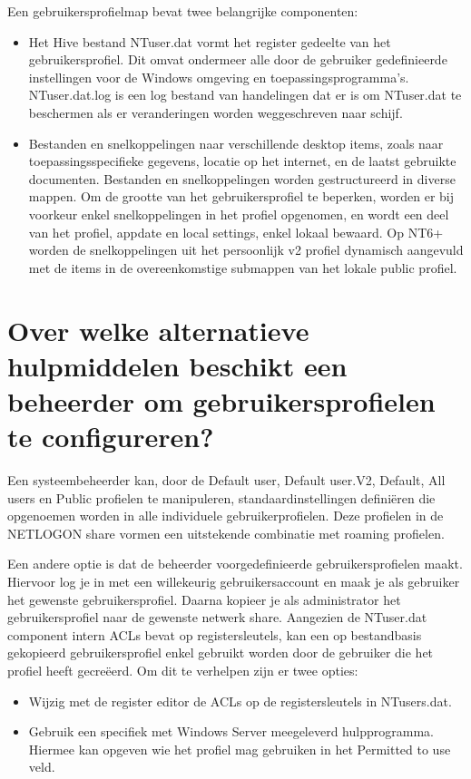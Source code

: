 Een gebruikersprofielmap bevat twee belangrijke componenten:
\begin{itemize}
	\item Het Hive bestand NTuser.dat vormt het register gedeelte van het
		gebruikersprofiel. Dit omvat ondermeer alle door de gebruiker
		gedefinieerde instellingen voor de Windows omgeving en
		toepassingsprogramma's. NTuser.dat.log is een log bestand van
		handelingen dat er is om NTuser.dat te beschermen als er
		veranderingen worden weggeschreven naar schijf.
	\item Bestanden en snelkoppelingen naar verschillende desktop items,
		zoals naar toepassingsspecifieke gegevens, locatie op het
		internet, en de laatst gebruikte documenten. Bestanden en
		snelkoppelingen worden gestructureerd in diverse mappen. Om de
		grootte van het gebruikersprofiel te beperken, worden er bij
		voorkeur enkel snelkoppelingen in het profiel opgenomen, en
		wordt een deel van het profiel, appdate en local settings, enkel
		lokaal bewaard.
		Op NT6+ worden de snelkoppelingen uit het persoonlijk v2 profiel
		dynamisch aangevuld met de items in de overeenkomstige submappen
		van het lokale public profiel.
\end{itemize}

\section{Over welke alternatieve hulpmiddelen beschikt een beheerder om
gebruikersprofielen te configureren?}

Een systeembeheerder kan, door de Default user, Default user.V2, Default, All
users en Public profielen te manipuleren, standaardinstellingen definiëren die
opgenoemen worden in alle individuele gebruikerprofielen. Deze profielen in de
NETLOGON share vormen een uitstekende combinatie met roaming profielen.

Een andere optie is dat de beheerder voorgedefinieerde gebruikersprofielen
maakt. Hiervoor log je in met een willekeurig gebruikersaccount en maak je als
gebruiker het gewenste gebruikersprofiel. Daarna kopieer je als administrator
het gebruikersprofiel naar de gewenste netwerk share. Aangezien de NTuser.dat
component intern ACLs bevat op registersleutels, kan een op bestandbasis
gekopieerd gebruikersprofiel enkel gebruikt worden door de gebruiker die het
profiel heeft gecreëerd. Om dit te verhelpen zijn er twee opties:
\begin{itemize}
	\item Wijzig met de register editor de ACLs op de registersleutels in
		NTusers.dat.
	\item Gebruik een specifiek met Windows Server meegeleverd
		hulpprogramma. Hiermee kan opgeven wie het profiel mag gebruiken
		in het Permitted to use veld.
\end{itemize}
